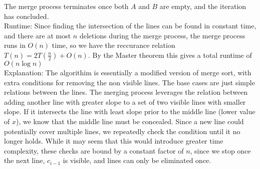 \documentclass{article}
\begin{document}
The merge process terminates once both $A$ and $B$ are empty, and the iteration has concluded. \\[1.0ex]
Runtime: Since finding the intersection of the lines can be found in constant time, and there are at most $n$ deletions during the merge process, the merge process runs in $O(n)$ time, so we have the reccurance relation $T(n) = 2 T(\frac{n}{2}) + O(n)$. By the Master theorem this gives a total runtime of $O(n \log n)$ \\[1.0ex]
Explanation: The algorithim is essentially a modified version of merge sort, with extra conditions for removing the non visible lines. The base cases are just simple relations between the lines. The merging process leverages the relation between adding 
another line with greater slope to a set of two visible lines with smaller slope. If it intersects the line with least slope prior to the middle line (lower value of $x$), we know that the middle line must be concealed. Since a new line could potentially cover multiple lines, we repeatedly check the condition until it no longer holds. While it may seem that this would introduce greater time complexity, these checks are bound by a constant factor of $n$, since we stop once the next line, $c_{i - 1}$ is visible, and lines can only be eliminated once.
\end{document}
